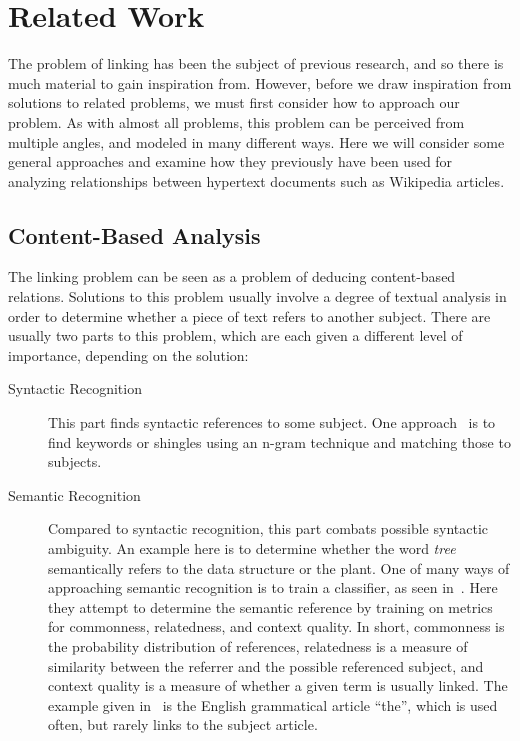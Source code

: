 \chapter{Related Work}\label{sec:related_work}

The problem of linking has been the subject of previous research, and so there is much material to gain inspiration from. However, before we draw inspiration from solutions to related problems, we must first consider how to approach our problem. As with almost all problems, this problem can be perceived from multiple angles, and modeled in many different ways. Here we will consider some general approaches and examine how they previously have been used for analyzing relationships between hypertext documents such as Wikipedia articles.

\section{Content-Based Analysis}\label{related_semantic_contextual}
The linking problem can be seen as a problem of deducing content-based relations. Solutions to this problem usually involve a degree of textual analysis in order to determine whether a piece of text refers to another subject. There are usually two parts to this problem, which are each given a different level of importance, depending on the solution:

\begin{description}
  \item[Syntactic Recognition] This part finds syntactic references to some subject. One approach~\cite{mihalcea2007wikify} is to find keywords or shingles using an n-gram technique and matching those to subjects.

  \item[Semantic Recognition] Compared to syntactic recognition, this part combats possible syntactic ambiguity. An example here is to determine whether the word \emph{tree} semantically refers to the data structure or the plant. One of many ways of approaching semantic recognition is to train a classifier, as seen in~\cite{milne2008learning}. Here they attempt to determine the semantic reference by training on metrics for commonness, relatedness, and context quality. In short, commonness is the probability distribution of references, relatedness is a measure of similarity between the referrer and the possible referenced subject, and context quality is a measure of whether a given term is usually linked. The example given in~\cite{milne2008learning} is the English grammatical article \enquote{the}, which is used often, but rarely links to the subject article.
\end{description}


